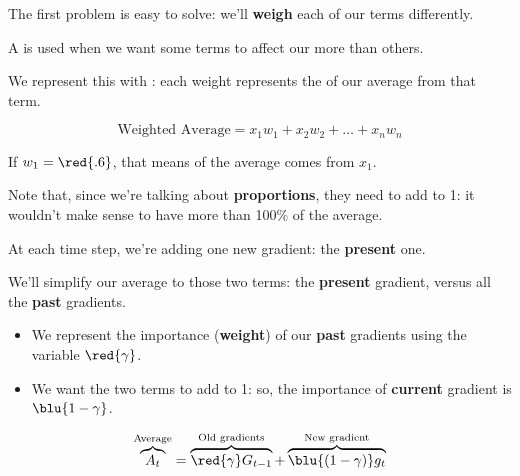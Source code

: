             The first problem is easy to solve: we'll \textbf{weigh} each of our terms differently.\\
            
            \begin{concept}
                A  is used when we want some terms to affect our  more than others.
                
                We represent this with : each weight represents the  of our average from that term.
                
                \begin{equation*}
                    \text{Weighted Average} =
                    x_1w_1 + x_2w_2 + \dots + x_nw_n
                \end{equation*}
            \end{concept}
            
            \miniex If $w_1=\red{.6}$, that means  of the average comes from $x_1$.
            
            Note that, since we're talking about \textbf{proportions}, they need to add to 1: it wouldn't make sense to have more than 100\% of the average.
            
            At each time step, we're adding one new gradient: the \textbf{present} one.
            
            We'll simplify our average to those two terms: the \textbf{present} gradient, versus all the \textbf{past} gradients.
            
            \begin{itemize}
                \item We represent the importance (\textbf{weight}) of our \textbf{past} gradients using the variable $\red{\gamma}$.
                
                \item We want the two terms to add to 1: so, the importance of \textbf{current} gradient is $\blu{1-\gamma}$.
            \end{itemize}
            
            \begin{equation}
                \overbrace{
                    A_t 
                }^{\text{Average}}
                =
                \overbrace{
                    \red{\gamma} G_{t-1}
                }^{\text{Old gradients}}
                + 
                \overbrace{
                    \blu{(1-\gamma)} g_{t}
                }^{\text{New gradient}}
            \end{equation}
            
